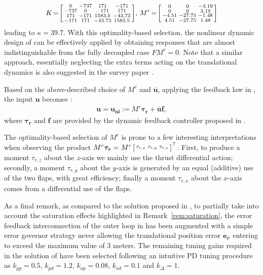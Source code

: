 \begin{align*}
  K \!=\! \left[ \begin{smallmatrix}  0   &   -737   &    171   &   -171\\
      -737  &  0   &  -171  &     171\\
       171  &    -171    &   1583.5    &   -43.73\\
      -171  &     171    &   -43.73    &   1583.5 \end{smallmatrix} \right]\!, \,
  M^r \!=\! \left[ \begin{smallmatrix}0     &          0   &   -3.19\\
                 0      &         0   &    3.19\\
               -4.51    &  -27.75    &   -1.48\\
                4.51    &  -27.75    &    1.48 \end{smallmatrix} \right]
\end{align*}
leading to $\kappa = 39.7$. With this optimality-based selection, the nonlinear dynamic design of \cite{2020e-MicCenZacFra} can be effectively applied by obtaining responses that are almost indistinguishable from the fully decoupled case 
$FM^r=0$. Note that a similar approach, essentially neglecting the extra terms acting on the translational dynamics is also suggested in the survey paper \cite{hamel_minhduc}. 

Based on the above-described choice of $M^r$ and $\boldsymbol{\bar u}$, applying the feedback law in \cite[eqn (19)]{2020e-MicCenZacFra}, the input $\boldsymbol{u}$ becomes : 
\begin{align}
\label{eq:u_nonlin}
    \boldsymbol{u} = \boldsymbol{u_{\text{nl}}} := M^r \boldsymbol{\tau_{r}} + \boldsymbol{\bar u} \boldsymbol{f},
\end{align}
where $\boldsymbol{\tau_{r}}$ and $\boldsymbol{f}$ are provided by the dynamic feedback controller proposed in \cite{2020e-MicCenZacFra}.

The optimality-based selection of $M^r$ is prone to a few interesting interpretations when observing the product 
$M^r \boldsymbol{\tau_{r}} = M^r \left[ \begin{smallmatrix}\tau_{r,x} & \tau_{r,y} & \tau_{r,z} \end{smallmatrix} \right]^\top$. First, 
to produce a moment $\tau_{r,z}$ about the $z$-axis we mainly use the thrust differential action; secondly, a moment $\tau_{r,y}$ about the $y$-axis is generated by an equal (additive) use of the two flaps, with great efficiency; finally a moment $\tau_{r,x}$ about the $x$-axis comes from a differential use of the flaps. 

As a final remark, as compared to the solution proposed in \cite{2020e-MicCenZacFra}, to partially take into account the saturation effects highlighted in Remark~\ref{rem:saturation}, the error feedback interconnection of the outer loop in \cite{2020e-MicCenZacFra} has been augmented with a simple error governor strategy never allowing the translational position error $\boldsymbol{\rm e}_p$ 
entering \cite[eqn. (22)]{2020e-MicCenZacFra} to exceed the maximum value of 3 meters. 
The remaining tuning gains required in the solution of \cite{2020e-MicCenZacFra} have been selected
following an intuitive PD tuning procedure
 as  $k_{pp} = 0.5$, $k_{pd} = 1.2$, $k_{ap} = 0.08$, $k_{ad} = 0.1$ and $k_{\Delta} = 1$.
 
